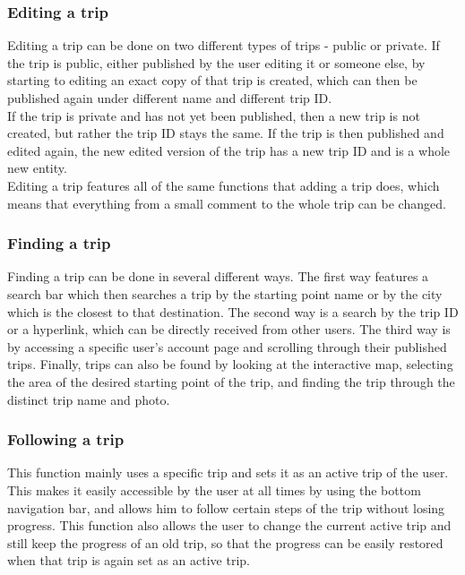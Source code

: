 \subsubsection{Editing a trip}
\hspace{\parindent}Editing a trip can be done on two different types of trips - public or private. If the trip is public, either published by the user editing it or someone else, by starting to editing an exact copy of that trip is created, which can then be published again under different name and different trip ID.\\
If the trip is private and has not yet been published, then a new trip is not created, but rather the trip ID stays the same. If the trip is then published and edited again, the new edited version of the trip has a new trip ID and is a whole new entity.\\
Editing a trip features all of the same functions that adding a trip does, which means that everything from a small comment to the whole trip can be changed. 
\subsubsection{Finding a trip}
\hspace{\parindent}Finding a trip can be done in several different ways. The first way features a search bar which then searches a trip by the starting point name or by the city which is the closest to that destination. The second way is a search by the trip ID or a hyperlink, which can be directly received from other users. The third way is by accessing a specific user's account page and scrolling through their published trips. Finally, trips can also be found by looking at the interactive map, selecting the area of the desired starting point of the trip, and finding the trip through the distinct trip name and photo.  
\subsubsection{Following a trip}
\hspace{\parindent}This function mainly uses a specific trip and sets it as an active trip of the user. This makes it easily accessible by the user at all times by using the bottom navigation bar, and allows him to follow certain steps of the trip without losing progress. This function also allows the user to change the current active trip and still keep the progress of an old trip, so that the progress can be easily restored when that trip is again set as an active trip.
